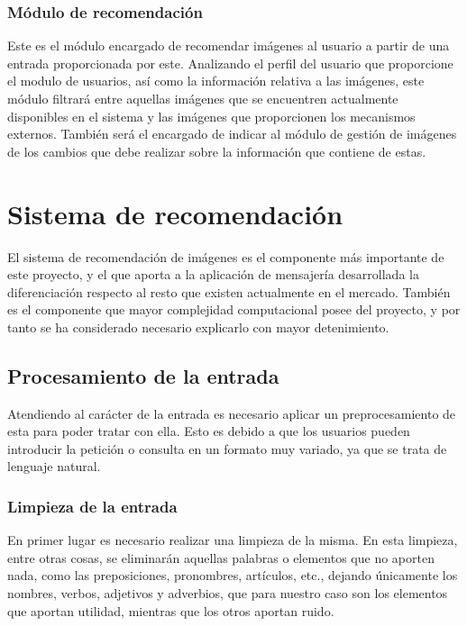 \subsubsection{Módulo de recomendación}
Este es el módulo encargado de recomendar imágenes al usuario a partir de una entrada proporcionada por este. Analizando el perfil del usuario que proporcione el modulo de usuarios, así como la información relativa a las imágenes, este módulo filtrará entre aquellas imágenes que se encuentren actualmente disponibles en el sistema y las imágenes que proporcionen los mecanismos externos. También será el encargado de indicar al módulo de gestión de imágenes de los cambios que debe realizar sobre la información que contiene de estas. 















\section{Sistema de recomendación}
El sistema de recomendación de imágenes es el componente más importante de este proyecto, y el que aporta a la aplicación de mensajería desarrollada la diferenciación respecto al resto que existen actualmente en el mercado. También es el componente que mayor complejidad computacional posee del proyecto, y por tanto se ha considerado necesario explicarlo con mayor detenimiento.


\subsection{Procesamiento de la entrada}
Atendiendo al carácter de la entrada es necesario aplicar un preprocesamiento de esta para poder tratar con ella. Esto es debido a que los usuarios pueden introducir la petición o consulta en un formato muy variado, ya que se trata de lenguaje natural.

\subsubsection{Limpieza de la entrada}


En primer lugar es necesario realizar una limpieza de la misma. En esta limpieza, entre otras cosas, se eliminarán aquellas palabras o elementos que no aporten nada, como las preposiciones, pronombres, artículos, etc., dejando únicamente los nombres, verbos, adjetivos y adverbios, que para nuestro caso son los elementos que aportan utilidad, mientras que los otros aportan ruido.

